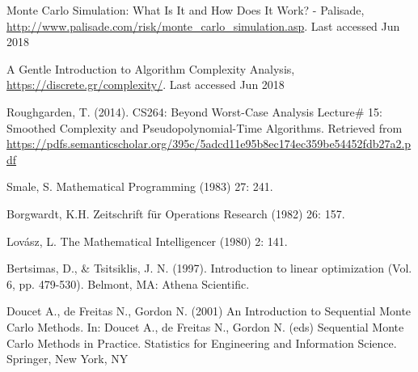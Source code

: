 \documentclass[runningheads]{llncs}
\begin{document}
%
%
%
% 
% 
%
\begin{thebibliography}{8}

Monte Carlo Simulation: What Is It and How Does It Work? - Palisade, \url{http://www.palisade.com/risk/monte\_carlo\_simulation.asp}. Last accessed
Jun 2018

A Gentle Introduction to Algorithm Complexity Analysis, \url{https://discrete.gr/complexity/}. Last accessed
Jun 2018

Roughgarden, T. (2014). CS264: Beyond Worst-Case Analysis Lecture\# 15: Smoothed Complexity and Pseudopolynomial-Time Algorithms. Retrieved from \url{https://pdfs.semanticscholar.org/395c/5adcd11e95b8ec174ec359be54452fdb27a2.pdf}

Smale, S. Mathematical Programming (1983) 27: 241. 

Borgwardt, K.H. Zeitschrift für Operations Research (1982) 26: 157. 

Lovász, L. The Mathematical Intelligencer (1980) 2: 141. 

Bertsimas, D., \& Tsitsiklis, J. N. (1997). Introduction to linear optimization (Vol. 6, pp. 479-530). Belmont, MA: Athena Scientific.

Doucet A., de Freitas N., Gordon N. (2001) An Introduction to Sequential Monte Carlo Methods. In: Doucet A., de Freitas N., Gordon N. (eds) Sequential Monte Carlo Methods in Practice. Statistics for Engineering and Information Science. Springer, New York, NY
\end{thebibliography}
\end{document}
